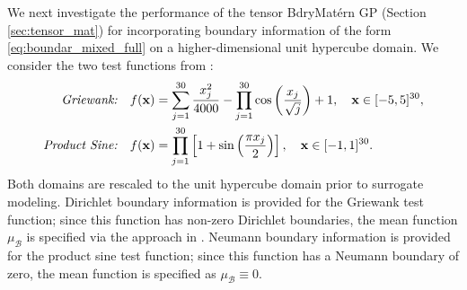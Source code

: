 \documentclass[aos,preprint]{imsart}
\theoremstyle{plain}
\newcommand{\Bx}{\bold x}
\theoremstyle{remark}
\begin{document}
We next investigate the performance of the tensor BdryMat\'ern GP (Section \ref{sec:tensor_mat}) for incorporating boundary information of the form \eqref{eq:boundar_mixed_full} on a higher-dimensional unit hypercube domain. We consider the two test functions from \cite{Surjano16}:
\begin{align}
\begin{split}
    \textit{Griewank:} \quad f(\Bx) &= \sum_{j=1}^{30}\frac{x_j^2}{4000}-\prod_{j=1}^{30}\cos\left(\frac{x_j}{\sqrt{j}}\right)+1 , \quad \Bx\in [-5,5]^{30},\\
    \textit{Product Sine:} \quad f(\Bx) &= \prod_{j=1}^{30}\left[1+\sin\left(\frac{\pi x_j}{2}\right)\right], \quad \Bx\in[-1,1 ]^{30}.
    \end{split}
\end{align}
Both domains are rescaled to the unit hypercube domain  prior to surrogate modeling. Dirichlet boundary information is provided for the Griewank test function; since this function has non-zero Dirichlet boundaries, the mean function $\mu_{\mathcal{B}}$ is specified via the approach in \cite{dalton2024boundary}. Neumann boundary information is provided for the product sine test function; since this function has a Neumann boundary of zero, the mean function is specified as $\mu_{\mathcal{B}} \equiv 0$.




\end{document}
